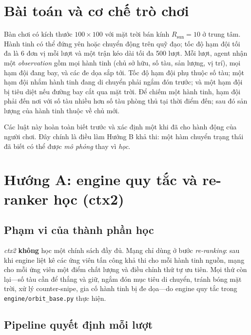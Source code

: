 \documentclass[conference]{IEEEtran}
\begin{document}
\section{Bài toán và cơ chế trò chơi}

Bàn chơi có kích thước $100 \times 100$ với mặt trời bán kính $R_{\mathrm{sun}} = 10$ ở trung tâm. Hành tinh có thể đứng yên hoặc chuyển động trên quỹ đạo; tốc độ hạm đội tối đa là 6 đơn vị mỗi lượt và một trận kéo dài tối đa 500 lượt. Mỗi lượt, agent nhận một \textit{observation} gồm mọi hành tinh (chủ sở hữu, số tàu, sản lượng, vị trí), mọi hạm đội đang bay, và các đe dọa sắp tới. Tốc độ hạm đội phụ thuộc số tàu; một hạm đội nhắm hành tinh đang di chuyển phải ngắm đón trước; và một hạm đội bị tiêu diệt nếu đường bay cắt qua mặt trời. Để chiếm một hành tinh, hạm đội phải đến nơi với số tàu nhiều hơn số tàu phòng thủ tại thời điểm đến; sau đó sản lượng của hành tinh thuộc về chủ mới.

Các luật này hoàn toàn biết trước và xác định một khi đã cho hành động của người chơi. Đây chính là điều làm Hướng B khả thi: một hàm chuyển trạng thái đã biết có thể được \emph{mô phỏng} thay vì \emph{học}.

\section{Hướng A: engine quy tắc và re-ranker học (ctx2)}
\label{sec:ctx2}

\subsection{Phạm vi của thành phần học}

\textit{ctx2} \textbf{không} học một chính sách đầy đủ. Mạng chỉ dùng ở bước \textit{re-ranking}: sau khi engine liệt kê các ứng viên tấn công khả thi cho mỗi hành tinh nguồn, mạng cho mỗi ứng viên một điểm chất lượng và điều chỉnh thứ tự ưu tiên. Mọi thứ còn lại---số tàu cần để thắng và giữ, ngắm đón mục tiêu di chuyển, tránh bóng mặt trời, xử lý counter-snipe, gia cố hành tinh bị đe dọa---do engine quy tắc trong \texttt{engine/orbit\_base.py} thực hiện.

\subsection{Pipeline quyết định mỗi lượt}
\end{document}
